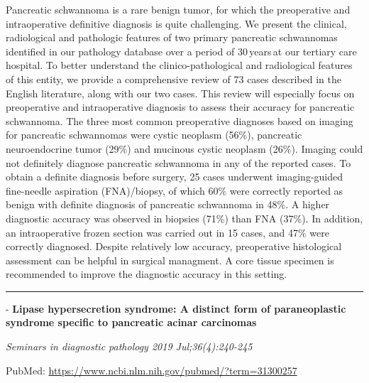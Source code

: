 \documentclass[]{article}
\begin{document}
Pancreatic schwannoma is a rare benign tumor, for which the preoperative
and intraoperative definitive diagnosis is quite challenging. We present
the clinical, radiological and pathologic features of two primary
pancreatic schwannomas identified in our pathology database over a
period of 30\,years\,at our tertiary care hospital. To better understand
the clinico-pathological and radiological features of this entity, we
provide a comprehensive review of 73 cases described in the English
literature, along with our two cases. This review will especially focus
on preoperative and intraoperative diagnosis to assess their accuracy
for pancreatic schwannoma. The three most common preoperative diagnoses
based on imaging for pancreatic schwannomas were cystic neoplasm (56\%),
pancreatic neuroendocrine tumor (29\%) and mucinous cystic neoplasm
(26\%). Imaging could not definitely diagnose pancreatic schwannoma in
any of the reported cases. To obtain a definite diagnosis before
surgery, 25 cases underwent imaging-guided fine-needle aspiration
(FNA)/biopsy, of which 60\% were correctly reported as benign with
definite diagnosis of pancreatic schwannoma in 48\%. A higher diagnostic
accuracy was observed in biopsies (71\%) than FNA (37\%). In addition,
an intraoperative frozen section was carried out in 15 cases, and 47\%
were correctly diagnosed. Despite relatively low accuracy, preoperative
histological assessment can be helpful in surgical managment. A core
tissue specimen is recommended to improve the diagnostic accuracy in
this setting.

{}

{}

\begin{center}\rule{0.5\linewidth}{\linethickness}\end{center}

 - \textbf{Lipase hypersecretion syndrome: A distinct form of
paraneoplastic syndrome specific to pancreatic acinar carcinomas}

\emph{Seminars in diagnostic pathology 2019 Jul;36(4):240-245}

PubMed: \url{https://www.ncbi.nlm.nih.gov/pubmed/?term=31300257}
\end{document}
